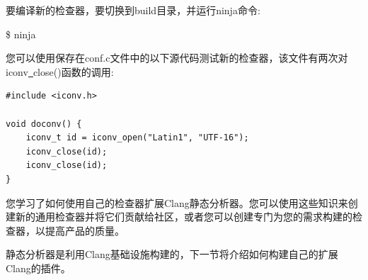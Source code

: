 要编译新的检查器，要切换到build目录，并运行ninja命令:\par

\begin{tcolorbox}[colback=white,colframe=black]
\$ ninja
\end{tcolorbox}

您可以使用保存在conf.c文件中的以下源代码测试新的检查器，该文件有两次对iconv\underline{~}close()函数的调用:\par

\begin{lstlisting}[caption={}]
#include <iconv.h>

void doconv() {
	iconv_t id = iconv_open("Latin1", "UTF-16");
	iconv_close(id);
	iconv_close(id);
}
\end{lstlisting}

您学习了如何使用自己的检查器扩展Clang静态分析器。您可以使用这些知识来创建新的通用检查器并将它们贡献给社区，或者您可以创建专门为您的需求构建的检查器，以提高产品的质量。 \par

静态分析器是利用Clang基础设施构建的，下一节将介绍如何构建自己的扩展Clang的插件。\par















